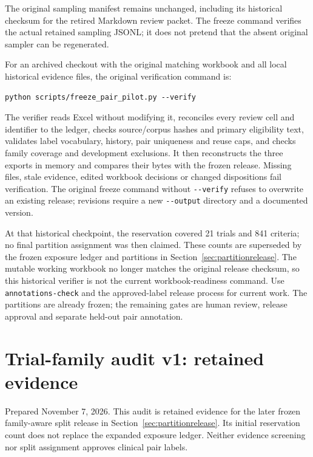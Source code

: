 \documentclass[10pt,letterpaper]{article}
\newcommand{\pathcode}[1]{\nolinkurl{#1}}
\begin{document}
The original sampling manifest remains unchanged, including its historical
checksum for the retired Markdown review packet. The freeze command verifies the actual retained sampling JSONL;
it does not pretend that the absent original sampler can be regenerated.

For an archived checkout with the original matching workbook and all local
historical evidence files, the original verification command is:
\begin{Verbatim}[breaklines=true,fontsize=\small]
python scripts/freeze_pair_pilot.py --verify
\end{Verbatim}
The verifier reads Excel without modifying it, reconciles every review cell
and identifier to the ledger, checks source/corpus hashes and primary
eligibility text, validates label vocabulary, history, pair uniqueness and
reuse caps, and checks family coverage and development exclusions. It then
reconstructs the three exports in memory and compares their bytes with the
frozen release. Missing files, stale evidence, edited workbook decisions or
changed dispositions fail verification. The original freeze command without
\pathcode{--verify} refuses to overwrite an existing release; revisions
require a new \pathcode{--output} directory and a documented version.

At that historical checkpoint, the reservation covered 21 trials and 841
criteria; no final partition assignment was then claimed. These counts are
superseded by the frozen exposure ledger and partitions in
Section~\ref{sec:partitionrelease}. The mutable working workbook no longer
matches the original release checksum, so this historical verifier is not
the current workbook-readiness command. Use \pathcode{annotations-check}
and the approved-label release process for current work. The partitions are
already frozen; the remaining gates are human review, release approval and
separate held-out pair annotation.

\section{Trial-family audit v1: retained evidence}\label{audit-trial-family-audit-v1}\label{sec:familyaudit}

Prepared November 7, 2026. This audit is retained evidence for the later
frozen family-aware split release in Section~\ref{sec:partitionrelease}.
Its initial reservation count does not replace the expanded exposure ledger.
Neither evidence screening nor split assignment approves clinical pair labels.
\end{document}
